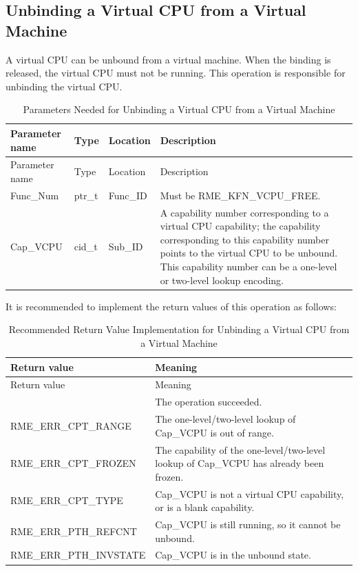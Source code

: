 \subsection{Unbinding a Virtual CPU from a Virtual Machine}\label{subsec:8-unbind-virtual-cpu-from-virtual-machine}

A virtual CPU can be unbound from a virtual machine. When the binding is released, the virtual CPU must not be running. This operation is responsible for unbinding the virtual CPU.

\begin{xltabular}{\textwidth}{@{}>{\hsize\raggedright\arraybackslash}X>{\hsize\raggedright\arraybackslash}X>{\hsize\raggedright\arraybackslash}X>{\hsize\raggedright\arraybackslash}X@{}}
\caption{Parameters Needed for Unbinding a Virtual CPU from a Virtual Machine}\label{tab:8-85-unbind-virtual-cpu-from-virtual-machine-parameters}\\
\toprule
Parameter name & Type & Location & Description\tabularnewline
\endfirsthead
\toprule
Parameter name & Type & Location & Description\tabularnewline
\midrule
\endhead
\bottomrule
\endlastfoot
Func\_Num & ptr\_t & Func\_ID &
Must be RME\_KFN\_VCPU\_FREE.\tabularnewline
Cap\_VCPU & cid\_t & Sub\_ID &
A capability number corresponding to a virtual CPU capability; the capability corresponding to this capability number points to the virtual CPU to be unbound. This capability number can be a one-level or two-level lookup encoding.\tabularnewline
\end{xltabular}
\nopagebreak[4]

It is recommended to implement the return values of this operation as follows:

\begin{xltabular}{\textwidth}{@{}>{\hsize\raggedright\arraybackslash}X>{\hsize\raggedright\arraybackslash}X@{}}
\caption{Recommended Return Value Implementation for Unbinding a Virtual CPU from a Virtual Machine}\label{tab:8-86-unbind-virtual-cpu-from-virtual-machine-suggested-return-values}\\
\toprule
Return value & Meaning\tabularnewline
\endfirsthead
\toprule
Return value & Meaning\tabularnewline
\midrule
\endhead
\bottomrule
{} & The operation succeeded.\tabularnewline
    RME\_ERR\_CPT\_RANGE & The one-level/two-level lookup of Cap\_VCPU is out of range.\tabularnewline
    RME\_ERR\_CPT\_FROZEN & The capability of the one-level/two-level lookup of Cap\_VCPU has already been frozen.\tabularnewline
    RME\_ERR\_CPT\_TYPE & Cap\_VCPU is not a virtual CPU capability, or is a blank capability.\tabularnewline
    RME\_ERR\_PTH\_REFCNT & Cap\_VCPU is still running, so it cannot be unbound.\tabularnewline
    RME\_ERR\_PTH\_INVSTATE & Cap\_VCPU is in the unbound state.\tabularnewline
\end{xltabular}
\nopagebreak[4]

